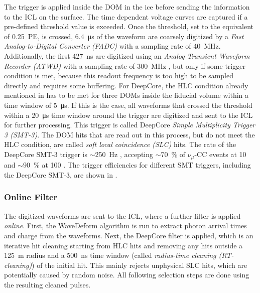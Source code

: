 The trigger is applied inside the DOM in the ice before sending the information to the ICL on the surface. The time dependent voltage curves are captured if a pre-defined threshold value is exceeded. Once the threshold, set to the equivalent of \SI{0.25}{PE}, is crossed, \SI{6.4}{\micro\second} of the waveform are coarsely digitized by a \textit{Fast Analog-to-Digital Converter (FADC)} with a sampling rate of \SI{40}{\mega\hertz}. Additionally, the first \SI{427}{\nano\second} are digitized using an \textit{Analog Transient Waveform Recorder (ATWD)} with a sampling rate of \SI{300}{\mega\hertz} , but only if some trigger condition is met, because this readout frequency is too high to be sampled directly and requires some buffering. For DeepCore, the HLC condition already mentioned in  has to be met for three DOMs inside the fiducial volume within a time window of \SI{5}{\micro\second}. If this is the case, all waveforms that crossed the threshold within a \SI{20}{\micro\second} time window around the trigger are digitized and sent to the ICL for further processing. This trigger is called DeepCore \textit{Simple Multiplicity Trigger 3 (SMT-3)}. The DOM hits that are read out in this process, but do not meet the HLC condition, are called \textit{soft local coincidence (SLC)} hits. The rate of the DeepCore SMT-3 trigger is $\sim$\SI{250}{\hertz} , accepting $\sim$\SI{70}{\percent} of $\nu_\mu$-CC events at \SI{10}{\gev} and $\sim$\SI{90}{\percent} at \SI{100}{\gev} . The trigger efficiencies for different SMT triggers, including the DeepCore SMT-3, are shown in .



\subsubsection{Online Filter} 

The digitized waveforms are sent to the ICL, where a further filter is applied \textit{online}. First, the WaveDeform algorithm is run to extract photon arrival times and charge from the waveforms. Next, the DeepCore filter is applied, which is an iterative hit cleaning starting from HLC hits and removing any hits outside a \SI{125}{\meter} radius and a \SI{500}{\nano\second} time window (called \textit{radius-time cleaning (RT-cleaning)}) of the initial hit. This mainly rejects unphysical SLC hits, which are potentially caused by random noise. All following selection steps are done using the resulting cleaned pulses.

